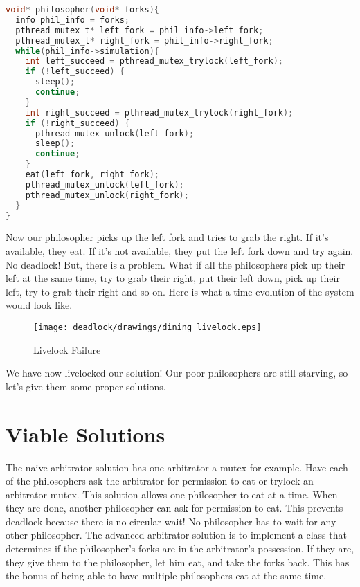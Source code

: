 \begin{lstlisting}[language=C]
void* philosopher(void* forks){
  info phil_info = forks;
  pthread_mutex_t* left_fork = phil_info->left_fork;
  pthread_mutex_t* right_fork = phil_info->right_fork;
  while(phil_info->simulation){
    int left_succeed = pthread_mutex_trylock(left_fork);
    if (!left_succeed) {
      sleep();
      continue;
    }
    int right_succeed = pthread_mutex_trylock(right_fork);
    if (!right_succeed) {
      pthread_mutex_unlock(left_fork);
      sleep();
      continue;
    }
    eat(left_fork, right_fork);
    pthread_mutex_unlock(left_fork);
    pthread_mutex_unlock(right_fork);
  }
}
\end{lstlisting}

Now our philosopher picks up the left fork and tries to grab the right.
If it's available, they eat.
If it's not available, they put the left fork down and try again.
No deadlock! But, there is a problem.
What if all the philosophers pick up their left at the same time, try to grab their right, put their left down, pick up their left, try to grab their right and so on.
Here is what a time evolution of the system would look like.

\begin{figure}[H]
	\centering
	\texttt{[image: deadlock/drawings/dining\_livelock.eps]}
	\caption{Livelock Failure}
\end{figure}

We have now livelocked our solution! Our poor philosophers are still starving, so let's give them some proper solutions.

\section{Viable Solutions}

The naive arbitrator solution has one arbitrator a mutex for example.
Have each of the philosophers ask the arbitrator for permission to eat or trylock an arbitrator mutex.
This solution allows one philosopher to eat at a time.
When they are done, another philosopher can ask for permission to eat.
This prevents deadlock because there is no circular wait! No philosopher has to wait for any other philosopher.
The advanced arbitrator solution is to implement a class that determines if the philosopher's forks are in the arbitrator's possession.
If they are, they give them to the philosopher, let him eat, and take the forks back.
This has the bonus of being able to have multiple philosophers eat at the same time.

